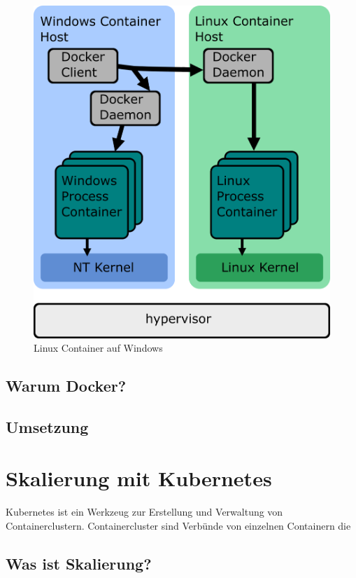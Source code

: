 \documentclass[12pt,a4paper]{scrartcl}
\begin{document}
\begin{figure}[h!]
	\centering
	\includegraphics[scale=2]{DockerWindows.png}
	\caption[https://docs.microsoft.com/de-de/virtualization/windowscontainers/deploy-containers/linux-containers]{Linux Container auf Windows}
\end{figure}

\subsection{Warum Docker?}

\subsection{Umsetzung}

\section{Skalierung mit Kubernetes} \label{kubernetes}
Kubernetes ist ein Werkzeug zur Erstellung und Verwaltung von Containerclustern. Containercluster sind Verbünde von einzelnen Containern die 

\subsection{Was ist Skalierung?}
\end{document}
